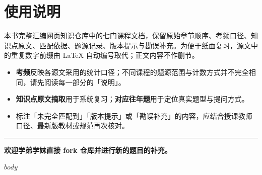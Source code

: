 \documentclass[UTF8,zihao=-4,openany,oneside,fontset=none]{ctexbook}
\begin{document}
\chapter*{使用说明}

本书完整汇编网页知识仓库中的七门课程文档，保留原始章节顺序、考频口径、知识点原文、匹配依据、题源记录、版本提示与勘误补充。为便于纸面复习，源文中的重复数字前缀由 LaTeX 自动编号取代；正文内容不作删节。

\begin{tcolorbox}[enhanced,breakable,colback=SubjectBlue!3,colframe=SubjectBlue!25,boxrule=0.45pt,arc=1.2mm,left=4mm,right=4mm,top=3mm,bottom=3mm]
  \begin{itemize}
    \item \textbf{考频}反映各源文采用的统计口径；不同课程的题源范围与计数方式并不完全相同，请先阅读每一部分的「说明」。
    \item \textbf{知识点原文摘取}用于系统复习；\textbf{对应往年题}用于定位真实题型与提问方式。
    \item 标注「未完全匹配到」「版本提示」或「勘误补充」的内容，应结合授课教师口径、最新版教材或规范再次核对。
  \end{itemize}
\end{tcolorbox}

\vspace{0.7em}
\noindent\textcolor{SubjectBlue}{\rule{1.2cm}{2pt}}\quad
\sffamily\bfseries 欢迎学弟学妹直接 fork 仓库并进行新的题目的补充。\normalfont

\clearpage
\tableofcontents
\clearpage

\mainmatter
$body$
\end{document}
